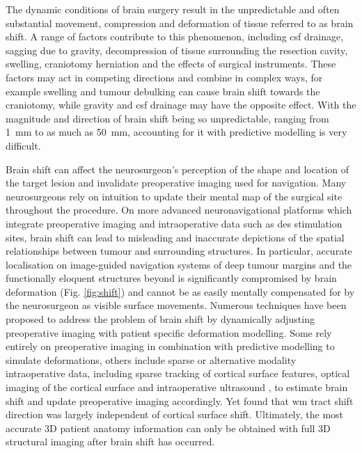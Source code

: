 The dynamic conditions of brain surgery result in the unpredictable and often substantial movement, compression and deformation of tissue referred to as brain shift.
A range of factors contribute to this phenomenon, including \gls{csf} drainage, sagging due to gravity, decompression of tissue surrounding the resection cavity, swelling, craniotomy herniation and the effects of surgical instruments\autocite{Gerard2017}.
These factors may act in competing directions and combine in complex ways, for example swelling and tumour debulking can cause brain shift towards the craniotomy, while gravity and \gls{csf} drainage may have the opposite effect\autocite{Roberts1998}.
With the magnitude and direction of brain shift being so unpredictable, ranging from 1~mm to as much as 50~mm\autocite{Gerard2017}, accounting for it with predictive modelling is very difficult\autocite{Bayer2017b}.

Brain shift can affect the neurosurgeon's perception of the shape and location of the target lesion and invalidate preoperative imaging used for navigation\autocite{Nimsky2000}.
Many neurosurgeons rely on intuition to update their mental map of the surgical site throughout the procedure.
On more advanced neuronavigational platforms which integrate preoperative imaging and intraoperative data such as \gls{des} stimulation sites, brain shift can lead to misleading and inaccurate depictions of the spatial relationships between tumour and surrounding structures.
In particular, accurate localisation on image-guided navigation systems of deep tumour margins and the functionally eloquent structures beyond is significantly compromised by brain deformation (Fig. \ref{fig:shift}) and cannot be as easily mentally compensated for by the neurosurgeon as visible surface movements\autocite{Nimsky2000}.
Numerous techniques have been proposed to address the problem of brain shift\autocite{Bayer2017b} by dynamically adjusting preoperative imaging with patient specific deformation modelling.
Some rely entirely on preoperative imaging in combination with predictive modelling to simulate deformations, others include sparse or alternative modality intraoperative data, including sparse tracking of cortical surface features\autocite{Luo2019}, optical imaging of the cortical surface\autocite{Skrinjar2002,Audette2005,Fan2017} and intraoperative ultrasound \autocite{Letteboer2005,Reinertsen2007,Bucki2012,Machado2019}, to estimate brain shift and update preoperative imaging accordingly.
Yet \textcite{Yang2017a} found that \gls{wm} tract shift direction was largely independent of cortical surface shift.
Ultimately, the most accurate 3D patient anatomy information can only be obtained with full 3D structural imaging after brain shift has occurred.

